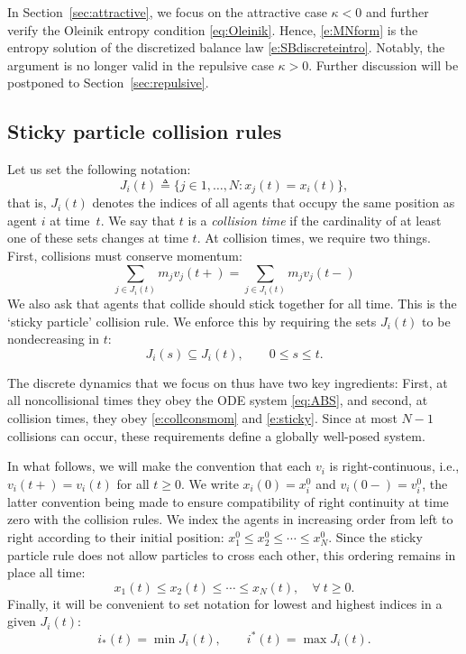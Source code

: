 \documentclass[10pt,a4paper]{amsart}
\begin{document}
	In Section~\ref{sec:attractive}, we focus on the attractive case $\kappa<0$ and further verify the Oleinik entropy condition \eqref{eq:Oleinik}. Hence, \eqref{e:MNform} is the entropy solution of the discretized balance law \eqref{e:SBdiscreteintro}. 
	Notably, the argument is no longer valid in the repulsive case $\kappa>0$. Further discussion will be postponed to Section~\ref{sec:repulsive}.
	

	
	
	\subsection{Sticky particle collision rules}
	\label{sec:sticky}
	

	Let us set the following notation:
	\[ 
	J_i(t)\triangleq\big\{j\in 1, \ldots, N:x_j(t) = x_i(t)\big\}, 
	\]
	that is, $J_i(t)$ denotes the indices of all agents that occupy the same position as agent $i$ at time~$t$.  We say that $t$ is a \textit{collision time} if the cardinality of at least one of these sets changes at time $t$.  At collision times, we require two things.  First, collisions must conserve momentum:
	\begin{equation}
		\label{e:collconsmom}
		\sum_{j\in J_i(t)} m_j v_j(t+) = \sum_{j\in J_i(t)} m_j v_j(t-)
	\end{equation}
	We also ask that agents that collide should stick together for all time.  This is the `sticky particle' collision rule.  We enforce this by requiring the sets $J_i(t)$ to be nondecreasing in $t$:
	\begin{equation}
		\label{e:sticky}
		J_i(s)\subseteq J_i(t),\qquad 0\le s\le t.    
	\end{equation}
	
	
	The discrete dynamics that we focus on thus have two key ingredients: First, at all noncollisional times they obey the ODE system \eqref{eq:ABS}, and second, at collision times, they obey \eqref{e:collconsmom} and \eqref{e:sticky}.  Since at most $N-1$ collisions can occur, these requirements define a globally well-posed system.
	
	In what follows, we will make the convention that each $v_i$ is right-continuous, i.e., $v_i(t+) = v_i(t)$ for all $t\ge 0$.  We write $x_i(0) = x_i^0$ and $v_i(0-) = v_i^0$, the latter convention being made to ensure compatibility of right continuity at time zero with the collision rules.  We index the agents in increasing order from left to right according to their initial position: $x_1^0\le x_2^0\le \cdots \le x_N^0$. Since the sticky particle rule does not allow particles to cross each other, this ordering remains in place all time:
	\begin{equation}\label{eq:order}	
		x_1(t)\le x_2(t)\le \cdots \le x_N(t),\quad \forall~t\geq0.
	\end{equation}
	Finally, it will be convenient to set notation for lowest and highest indices in a given $J_i(t)$:
	\[
	i_*(t) = \min J_i(t), 
	\qquad 
	i^*(t) = \max J_i(t).
	\] 
	
\end{document}
